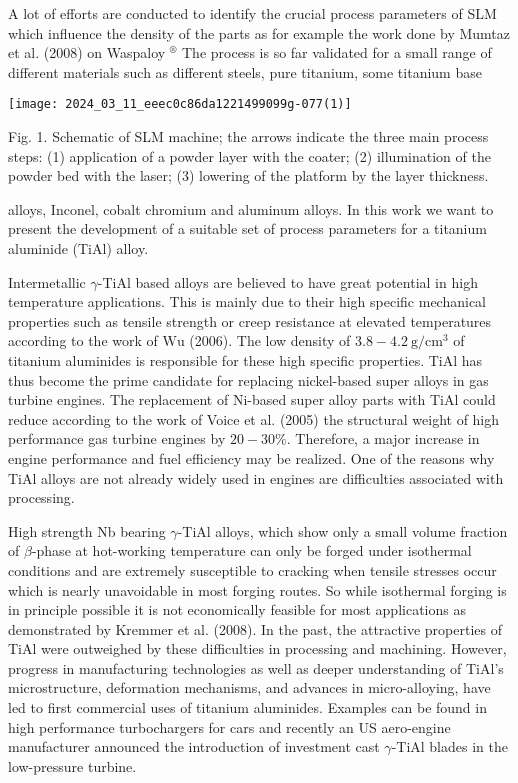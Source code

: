 \documentclass[10pt]{article}
\begin{document}
A lot of efforts are conducted to identify the crucial process parameters of SLM which influence the density of the parts as for example the work done by Mumtaz et al. (2008) on Waspaloy ${ }^{\circledR}$ The process is so far validated for a small range of different materials such as different steels, pure titanium, some titanium base

\begin{center}
\texttt{[image: 2024\_03\_11\_eeec0c86da1221499099g-077(1)]}
\end{center}

Fig. 1. Schematic of SLM machine; the arrows indicate the three main process steps: (1) application of a powder layer with the coater; (2) illumination of the powder bed with the laser; (3) lowering of the platform by the layer thickness.

alloys, Inconel, cobalt chromium and aluminum alloys. In this work we want to present the development of a suitable set of process parameters for a titanium aluminide (TiAl) alloy.

Intermetallic $\gamma$-TiAl based alloys are believed to have great potential in high temperature applications. This is mainly due to their high specific mechanical properties such as tensile strength or creep resistance at elevated temperatures according to the work of $\mathrm{Wu}$ (2006). The low density of $3.8-4.2 \mathrm{~g} / \mathrm{cm}^{3}$ of titanium aluminides is responsible for these high specific properties. TiAl has thus become the prime candidate for replacing nickel-based super alloys in gas turbine engines. The replacement of Ni-based super alloy parts with TiAl could reduce according to the work of Voice et al. (2005) the structural weight of high performance gas turbine engines by $20-30 \%$. Therefore, a major increase in engine performance and fuel efficiency may be realized. One of the reasons why TiAl alloys are not already widely used in engines are difficulties associated with processing.

High strength Nb bearing $\gamma$-TiAl alloys, which show only a small volume fraction of $\beta$-phase at hot-working temperature can only be forged under isothermal conditions and are extremely susceptible to cracking when tensile stresses occur which is nearly unavoidable in most forging routes. So while isothermal forging is in principle possible it is not economically feasible for most applications as demonstrated by Kremmer et al. (2008). In the past, the attractive properties of TiAl were outweighed by these difficulties in processing and machining. However, progress in manufacturing technologies as well as deeper understanding of TiAl's microstructure, deformation mechanisms, and advances in micro-alloying, have led to first commercial uses of titanium aluminides. Examples can be found in high performance turbochargers for cars and recently an US aero-engine manufacturer announced the introduction of investment cast $\gamma$-TiAl blades in the low-pressure turbine.
\end{document}
